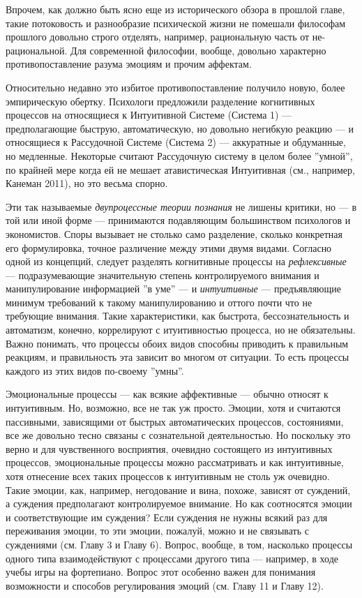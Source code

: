 \documentclass[11pt]{book}
\begin{document}
Впрочем, как должно быть ясно еще из исторического обзора в прошлой главе, такие потоковость и разнообразие психической жизни не помешали философам прошлого довольно строго отделять, например, рациональную часть от не-рациональной. Для современной философии, вообще, довольно характерно противопоставление разума эмоциям и прочим аффектам.

Относительно недавно это избитое противопоставление получило новую, более эмпирическую обертку. Психологи предложили разделение когнитивных процессов на относящиеся к Интуитивной Системе (Система 1) --- предполагающие быструю, автоматическую, но довольно негибкую реакцию --- и относящиеся к Рассудочной Системе (Система 2) --- аккуратные и обдуманные, но медленные. Некоторые считают Рассудочную систему в целом более ''умной'', по крайней мере когда ей не мешает атавистическая Интуитивная (см., например, Канеман 2011), но это весьма спорно.

Эти так называемые \textit{двупроцессные теории познания} не лишены критики, но --- в той или иной форме --- принимаются подавляющим большинством психологов и экономистов. Споры вызывает не столько само разделение, сколько конкретная его формулировка, точное различение между этими двумя видами. Согласно одной из концепций, следует разделять когнитивные процессы на \textit{рефлексивные} --- подразумевающие значительную степень контролируемого внимания и манипулирование информацией ''в уме'' --- и \textit{интуитивные} --- предъявляющие минимум требований к такому манипулированию и оттого почти что не требующие внимания. Такие характеристики, как быстрота, бессознательность и автоматизм, конечно, коррелируют с итуитивностью процесса, но не обязательны. Важно понимать, что процессы обоих видов способны приводить к правильным реакциям, и правильность эта зависит во многом от ситуации. То есть процессы каждого из этих видов по-своему ''умны''.

Эмоциональные процессы --- как всякие аффективные --- обычно относят к интуитивным. Но, возможно, все не так уж просто. Эмоции, хотя и считаются пассивными, зависящими от быстрых автоматических процессов, состояниями, все же довольно тесно связаны с сознательной деятельностью. Но поскольку это верно и для чувственного восприятия, очевидно состоящего из интуитивных процессов, эмоциональные процессы можно рассматривать и как интуитивные, хотя отнесение всех таких процессов к интуитивным не столь уж очевидно. Такие эмоции, как, например, негодование и вина, похоже, зависят от суждений, а суждения предполагают контролируемое внимание. Но как соотносятся эмоции и соответствующие им суждения? Если суждения не нужны всякий раз для переживания эмоции, то эти эмоции, пожалуй, можно и не связывать с суждениями (см. Главу 3 и Главу 6). Вопрос, вообще, в том, насколько процессы одного типа взаимодействуют с процессами другого типа --- например, в ходе учебы игры на фортепиано. Вопрос этот особенно важен для понимания возможности и способов регулирования эмоций (см. Главу 11 и Главу 12).
\end{document}
